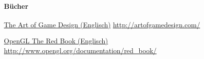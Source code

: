 \documentclass[12pt,a4paper,titlepage]{article}
\begin{document}
		\paragraph{Bücher}
		\begin{itemize*}
			\item \href{http://artofgamedesign.com/}{The Art of Game Design (Englisch)} \url{http://artofgamedesign.com/}
			\item \href{http://www.opengl.org/documentation/red_book/}{OpenGL The Red Book (Englisch)} \url{http://www.opengl.org/documentation/red_book/}
		\end{itemize*}
		
\end{document}
